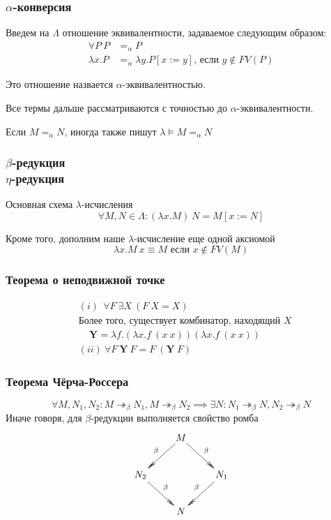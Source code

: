 \documentclass{beamer}
\newcommand{\rbm}{\twoheadrightarrow_\beta}
\begin{document}
\begin{frame}\frametitle{$\alpha$-конверсия}
    
Введем на $\Lambda$ отношение эквивалентности, задаваемое следующим образом:
\begin{align*}
	\forall P\ P &=_\alpha P\\
	\lambda x.P &=_\alpha \lambda y.P[x:=y] \text{, если } y \not\in FV(P)
\end{align*}

Это отношение назвается $\alpha$-эквивалентностью.

Все термы дальше рассматриваются с точностью до $\alpha$-эквивалентности.

Если $M =_\alpha N$, иногда также пишут $\lambda\models M =_\alpha N$

\end{frame}

\begin{frame}\frametitle{$\beta$-редукция~\\$\eta$-редукция}
    
Основная схема $\lambda$-исчисления
\begin{equation*}
	\forall M, N \in \Lambda : (\lambda x.M)\ N = M[x := N]\tag{$\beta$}
\end{equation*}

Кроме того, дополним наше $\lambda$-исчисление еще одной аксиомой
\begin{equation*}
	\lambda x.M\ x \equiv M \text{ если }x \not\in FV(M) \tag{$\eta$}
\end{equation*}

\end{frame}

\begin{frame}\frametitle{Теорема о неподвижной точке}
    
\begin{align*}
	&(i)\ \ \forall F\ \exists X\ (F\ X = X) \\
	&\text{Более того, существует комбинатор, находящий $X$}\\
	&\ \ \ \ \ \boldsymbol{Y} = \lambda f.(\lambda x.f\ (x\ x)) (\lambda x.f\ (x\ x))\\
	&(ii)\ \forall F\ \boldsymbol{Y}\ F=F\ (\boldsymbol{Y}\ F)
\end{align*}

\end{frame}

\begin{frame}\frametitle{Теорема Чёрча-Россера}
    
	$$
	\forall M,N_1,N_2:M
	\rbm N_1, M
	\rbm N_2
	\implies
	\exists N : N_1
	\rbm N,N_2
	\rbm N
	$$
	Иначе говоря, для $\beta$-редукции выполняется свойство ромба
	\begin{align*}
		\xymatrix{
		& \ar@{->>}[dl]_\beta M \ar@{->>}[dr]^\beta \\
		N_2 \ar@{->>}[dr]^\beta & & N_1 \ar@{->>}[dl]_\beta \\
		&N
	}
	\end{align*}

\end{frame}
\end{document}
